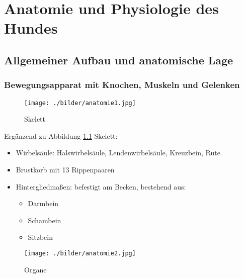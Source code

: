 \chapter{Anatomie und Physiologie des Hundes}


\section{Allgemeiner Aufbau und anatomische Lage}

    \subsection{Bewegungsapparat mit Knochen, Muskeln und Gelenken}
    \begin{figure}[ht]
    \centering
    \texttt{[image: ./bilder/anatomie1.jpg]}
    \caption{Skelett}
    \label{Skelett}
    \end{figure}

    Ergänzend zu Abbildung \ref{Skelett} Skelett:
    \begin{itemize}
        \item Wirbelsäule: Halswirbelsäule, Lendenwirbelsäule, Kreuzbein, Rute
        \item Brustkorb mit 13 Rippenpaaren
        \item Hintergliedmaßen: befestigt am Becken, bestehend aus:
        \begin{itemize}
            \item Darmbein
            \item Schambein
            \item Sitzbein
        \end{itemize}
    \end{itemize}

    \begin{figure}[ht]
    \centering
    \texttt{[image: ./bilder/anatomie2.jpg]}
    \caption{Organe}
    \label{Organe}
    \end{figure}

